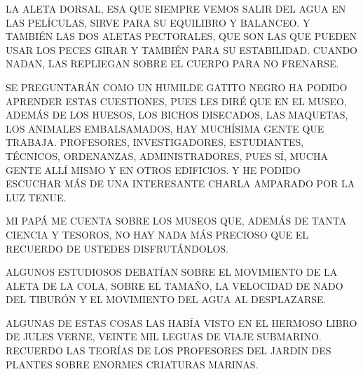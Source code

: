  LA ALETA DORSAL, ESA QUE SIEMPRE VEMOS SALIR DEL AGUA EN LAS PELÍCULAS, SIRVE PARA SU EQUILIBRO Y BALANCEO. Y TAMBIÉN LAS DOS ALETAS PECTORALES, QUE SON LAS QUE PUEDEN USAR LOS PECES GIRAR Y TAMBIÉN PARA SU ESTABILIDAD. CUANDO NADAN, LAS REPLIEGAN SOBRE EL CUERPO PARA NO FRENARSE.
 
 SE PREGUNTARÁN COMO UN HUMILDE GATITO NEGRO HA PODIDO APRENDER ESTAS CUESTIONES, PUES LES DIRÉ QUE EN EL MUSEO, ADEMÁS DE LOS HUESOS, LOS BICHOS DISECADOS, LAS MAQUETAS, LOS ANIMALES EMBALSAMADOS, HAY MUCHÍSIMA GENTE QUE TRABAJA. PROFESORES, INVESTIGADORES, ESTUDIANTES, TÉCNICOS, ORDENANZAS, ADMINISTRADORES, PUES SÍ, MUCHA GENTE ALLÍ MISMO Y EN OTROS EDIFICIOS. Y HE PODIDO ESCUCHAR MÁS DE UNA INTERESANTE CHARLA AMPARADO POR LA LUZ TENUE.
 
 
 \newpage
MI PAPÁ ME CUENTA SOBRE LOS MUSEOS QUE, ADEMÁS DE TANTA CIENCIA Y TESOROS, NO HAY NADA MÁS PRECIOSO QUE EL RECUERDO DE USTEDES DISFRUTÁNDOLOS.
 
\begin{center}
	
	\begin{minipage}[r]{.7\textwidth}%
	\end{minipage}
	
\end{center}


\newpage
{}

ALGUNOS ESTUDIOSOS DEBATÍAN SOBRE EL MOVIMIENTO DE LA ALETA DE LA COLA, SOBRE EL TAMAÑO, LA VELOCIDAD DE NADO DEL TIBURÓN Y EL MOVIMIENTO DEL AGUA AL DESPLAZARSE.

	\begin{minipage}[r]{.45\textwidth}%
	\end{minipage}\hfill
	\begin{minipage}[r]{.45\textwidth}%
	ALGUNAS DE ESTAS COSAS LAS HABÍA VISTO EN EL HERMOSO LIBRO DE JULES VERNE, VEINTE MIL LEGUAS DE VIAJE SUBMARINO. RECUERDO LAS TEORÍAS DE LOS PROFESORES DEL JARDIN DES PLANTES   SOBRE ENORMES CRIATURAS MARINAS.		
	\end{minipage}	

